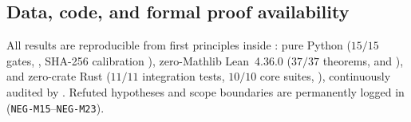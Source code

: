 \documentclass[11pt]{amsart}
\numberwithin{equation}{section}
\theoremstyle{plain}
\theoremstyle{definition}\newtheorem{definition}[theorem]{Definition}
\theoremstyle{remark}\newtheorem{remark}[theorem]{Remark}
\begin{document}
\subsection*{Data, code, and formal proof availability}
All results are reproducible from first principles inside : pure Python ($15/15$ gates, , SHA-256 calibration ), zero-Mathlib Lean~4.36.0 ($37/37$ theorems,  and ), and zero-crate Rust ($11/11$ integration tests, $10/10$ core suites, ), continuously audited by . Refuted hypotheses and scope boundaries are permanently logged in  (\texttt{NEG-M15}--\texttt{NEG-M23}).



\end{document}
